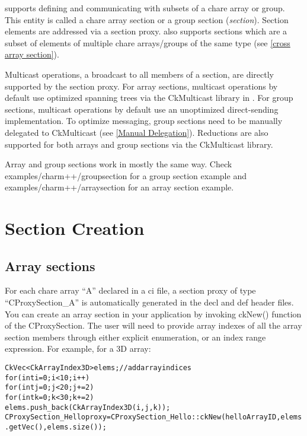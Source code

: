 \charmpp{} supports defining and communicating with subsets of a chare
array or group.  This entity is called a chare array section or a group section (\emph{section}).
Section elements are addressed via a section proxy.
\charmpp{} also supports sections which are a subset of elements of
multiple chare arrays/groups of the same type (see \ref{cross array section}).

Multicast operations, a broadcast to all members of a section, are directly
supported by the section proxy. For array sections, multicast operations by default
use optimized spanning trees via the CkMulticast library in \charmpp{}.
For group sections, multicast operations by default use an unoptimized
direct-sending implementation.
To optimize messaging, group sections need to be manually delegated to CkMulticast
(see \ref{Manual Delegation}).
Reductions are also supported for both arrays and group sections via the CkMulticast library.

Array and group sections work in mostly the same way.
Check examples/charm++/groupsection for a group section example and
examples/charm++/arraysection for an array section example.

\section{Section Creation}
\label{section creation}

\subsection{Array sections}

For each chare array ``A'' declared in a ci file, a section proxy
of type ``CProxySection\_A'' is automatically generated in the decl and def
header files.
You can create an array section in your application by invoking ckNew() function of the CProxySection.
The user will need to provide array indexes
of all the array section members through either explicit enumeration, or an index range expression.
For example, for a 3D array:

\begin{alltt}
  CkVec<CkArrayIndex3D> elems;    // add array indices
  for (int i=0; i<10; i++)
    for (int j=0; j<20; j+=2)
      for (int k=0; k<30; k+=2)
         elems.push_back(CkArrayIndex3D(i, j, k));
  CProxySection_Hello proxy = CProxySection_Hello::ckNew(helloArrayID, elems.getVec(), elems.size());
\end{alltt}


